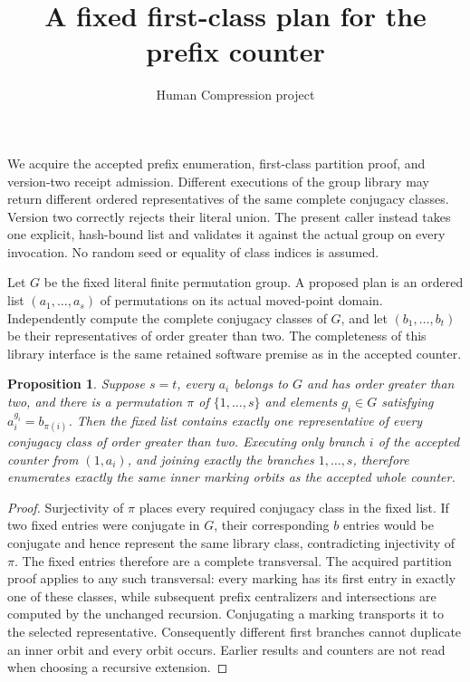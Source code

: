 \documentclass[11pt,a4paper]{article}
\title{A fixed first-class plan for the prefix counter}
\author{Human Compression project}\date{}
\newtheorem{proposition}{Proposition}
\begin{document}
\maketitle
We acquire the accepted prefix enumeration, first-class partition proof,
and version-two receipt admission. Different executions of the group
library may return different ordered representatives of the same complete
conjugacy classes. Version two correctly rejects their literal union.
The present caller instead takes one explicit, hash-bound list and
validates it against the actual group on every invocation. No random seed
or equality of class indices is assumed.

Let $G$ be the fixed literal finite permutation group. A proposed plan is
an ordered list $(a_1,\ldots,a_s)$ of permutations on its actual moved-point
domain. Independently compute the complete conjugacy classes of $G$, and
let $(b_1,\ldots,b_t)$ be their representatives of order greater than two.
The completeness of this library interface is the same retained software
premise as in the accepted counter.
\begin{proposition}
Suppose $s=t$, every $a_i$ belongs to $G$ and has order greater than two,
and there is a permutation $\pi$ of $\{1,\ldots,s\}$ and elements
$g_i\in G$ satisfying $a_i^{g_i}=b_{\pi(i)}$. Then the fixed list contains
exactly one representative of every conjugacy class of order greater than
two. Executing only branch $i$ of the accepted counter from $(1,a_i)$,
and joining exactly the branches $1,\ldots,s$, therefore enumerates
exactly the same inner marking orbits as the accepted whole counter.
\end{proposition}
\begin{proof}
Surjectivity of $\pi$ places every required conjugacy class in the fixed
list. If two fixed entries were conjugate in $G$, their corresponding
$b$ entries would be conjugate and hence represent the same library
class, contradicting injectivity of $\pi$. The fixed entries therefore
are a complete transversal. The acquired partition proof applies to any
such transversal: every marking has its first entry in exactly one of
these classes, while subsequent prefix centralizers and intersections
are computed by the unchanged recursion. Conjugating a marking transports
it to the selected representative. Consequently different first branches
cannot duplicate an inner orbit and every orbit occurs. Earlier results
and counters are not read when choosing a recursive extension.
\end{proof}
\end{document}
